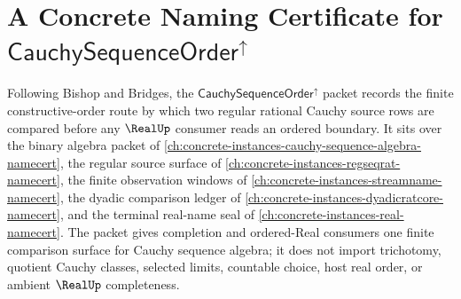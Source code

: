 \chapter{A Concrete Naming Certificate for $\mathsf{CauchySequenceOrder}^{\uparrow}$}
\label{ch:concrete-instances-cauchy-sequence-order-namecert}

Following Bishop and Bridges, the $\mathsf{CauchySequenceOrder}^{\uparrow}$ packet records the finite constructive-order route by which two regular rational Cauchy source rows are compared before any $\RealUp$ consumer reads an ordered boundary. It sits over the binary algebra packet of \autoref{ch:concrete-instances-cauchy-sequence-algebra-namecert}, the regular source surface of \autoref{ch:concrete-instances-regseqrat-namecert}, the finite observation windows of \autoref{ch:concrete-instances-streamname-namecert}, the dyadic comparison ledger of \autoref{ch:concrete-instances-dyadicratcore-namecert}, and the terminal real-name seal of \autoref{ch:concrete-instances-real-namecert}. The packet gives completion and ordered-Real consumers one finite comparison surface for Cauchy sequence algebra; it does not import trichotomy, quotient Cauchy classes, selected limits, countable choice, host real order, or ambient $\RealUp$ completeness.

